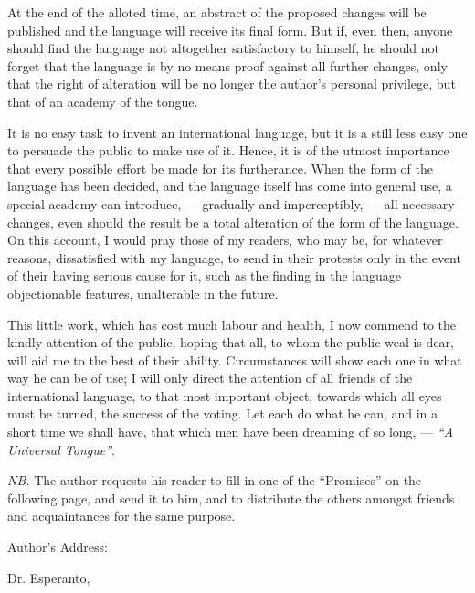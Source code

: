 \documentclass[12pt,twoside]{book}
\begin{document}
At the end of the alloted time, an abstract of the proposed changes will be published and the language will receive its final form. But if, even then, anyone should find the language not altogether satisfactory to himself, he should not forget that the language is by no means proof against all further changes, only that the right of alteration will be no longer the author’s personal privilege, but that of an academy of the tongue.

It is no easy task to invent an international language, but it is a still less easy one to persuade the public to make use of it. Hence, it is of the utmost importance that every possible effort be made for its furtherance. When the form of the language has been decided, and the language itself has come into general use, a special academy can introduce, --- gradually and imperceptibly, --- all necessary changes, even should the result be a total alteration of the form of the language. On this account, I would pray those of my readers, who may be, for whatever reasons, dissatisfied with my language, to send in their protests only in the event of their having serious cause for it, such as the finding in the language objectionable features, unalterable in the future.

This little work, which has cost much labour and health, I now commend to the kindly attention of the public, hoping that all, to whom the public weal is dear, will aid me to the best of their ability. Circumstances will show each one in what way he can be of use; I will only direct the attention of all friends of the international language, to that most important object, towards which all eyes must be turned, the success of the voting. Let each do what he can, and in a short time we shall have, that which men have been dreaming of so long, --- \emph{``A Universal Tongue''}.

\sectionline

\clearpage

\emph{NB.} The author requests his reader to fill in one of the ``Promises'' on the following page, and send it to him, and to distribute the others amongst friends and acquaintances for the same purpose.

Author's Address:

\vspace{1ex}

\hspace{1.5em} Dr. Esperanto,

\vspace{1ex}
\end{document}

